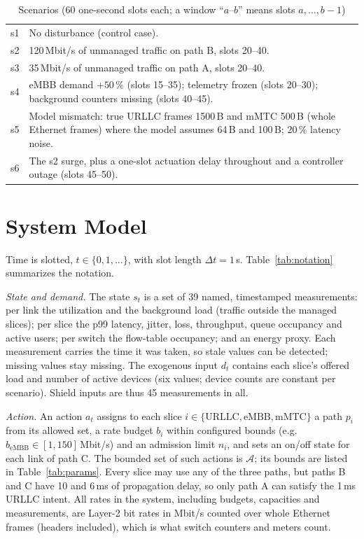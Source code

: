 \documentclass[conference]{IEEEtran}
\newcommand{\Acal}{\mathcal{A}}
\begin{document}
\begin{table}[t]
\caption{Scenarios (60 one-second slots each; a window ``$a$--$b$'' means slots $a,\dots,b-1$)}
\label{tab:scenarios}
\centering
\footnotesize
\begin{tabular}{@{}lp{6.2cm}@{}}
\toprule
s1 & No disturbance (control case). \\
s2 & 120\,Mbit/s of unmanaged traffic on path B, slots 20--40. \\
s3 & 35\,Mbit/s of unmanaged traffic on path A, slots 20--40. \\
s4 & eMBB demand $+50\,\%$ (slots 15--35); telemetry frozen (slots 20--30); background counters missing (slots 40--45). \\
s5 & Model mismatch: true URLLC frames 1500\,B and mMTC 500\,B (whole Ethernet frames) where the model assumes 64\,B and 100\,B; 20\,\% latency noise. \\
s6 & The s2 surge, plus a one-slot actuation delay throughout and a controller outage (slots 45--50). \\
\bottomrule
\end{tabular}
\end{table}

\section{System Model}
\label{sec:system}

Time is slotted, $t \in \{0,1,\dots\}$, with slot length $\Delta t = 1$\,s.
Table~\ref{tab:notation} summarizes the notation.

\emph{State and demand.} The state $s_t$ is a set of 39 named, timestamped
measurements: per link the utilization and the background load (traffic outside the
managed slices); per slice the p99 latency, jitter, loss, throughput, queue occupancy
and active users; per switch the flow-table occupancy; and an energy proxy. Each
measurement carries the time it was taken, so stale values can be detected; missing
values stay missing. The exogenous input $d_t$ contains each slice's offered load
and number of active devices (six values; device counts are
constant per scenario). Shield inputs are thus 45 measurements in all.

\emph{Action.} An action $a_t$ assigns to each slice $i \in \{\text{URLLC},
\text{eMBB}, \text{mMTC}\}$ a path $p_i$ from its allowed set, a rate budget $b_i$
within configured bounds (e.g.\ $b_{\mathrm{eMBB}} \in [1,150]$\,Mbit/s) and an
admission limit $n_i$, and sets an on/off state for each link of path C. The bounded
set of such actions is $\Acal$; its bounds are listed in Table~\ref{tab:params}. Every
slice may use any of the three paths, but paths B and C have 10 and 6\,ms of
propagation delay, so only path A can satisfy the 1\,ms URLLC intent. All rates in the system, including budgets,
capacities and measurements, are Layer-2 bit rates in Mbit/s counted over whole
Ethernet frames (headers included), which is what switch counters and meters count.
\end{document}
